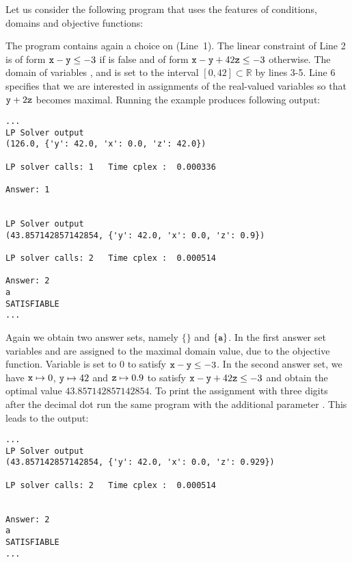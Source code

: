 \begin{example}\label{ex:lp:extended}
Let us consider the following program that uses the features of conditions, domains and objective functions:

The program contains again a choice on  (Line~1). 
%
The linear constraint of Line 2 is of form $\texttt{x}-\texttt{y}\leq-3$ if  is false 
and of form $\texttt{x}-\texttt{y}+42\texttt{z}\leq-3$ otherwise. 
%
The domain of variables ,  and  is set to the interval $[0,42]\subset\mathbb{R}$ by lines 3-5. 
%
Line 6 specifies that we are interested in assignments of the real-valued variables so that $\texttt{y}+2\texttt{z}$ becomes maximal. 
%
Running the example produces following output:
\begin{lstlisting}[numbers=none]
...
LP Solver output
(126.0, {'y': 42.0, 'x': 0.0, 'z': 42.0})

LP solver calls: 1   Time cplex :  0.000336

Answer: 1


LP Solver output
(43.857142857142854, {'y': 42.0, 'x': 0.0, 'z': 0.9})

LP solver calls: 2   Time cplex :  0.000514

Answer: 2
a
SATISFIABLE
...
\end{lstlisting}
Again we obtain two answer sets, namely $\{\}$ and $\{\texttt{a}\}$. 
%
In the first answer set variables  and  are assigned to the maximal domain value, due to the objective function. 
%
Variable  is set to 0 to satisfy $\texttt{x}-\texttt{y}\leq-3$. 
%
In the second answer set, we have $\texttt{x}\mapsto0$, $\texttt{y}\mapsto42$ and $\texttt{z}\mapsto0.9$ to satisfy $\texttt{x}-\texttt{y}+42\texttt{z}\leq-3$ and 
obtain the optimal value $43.857142857142854$. 
%
To print the assignment with three digits after the decimal dot run the same program with the additional parameter .
%
This leads to the output: 
\begin{lstlisting}[numbers=none]
...
LP Solver output
(43.857142857142854, {'y': 42.0, 'x': 0.0, 'z': 0.929})

LP solver calls: 2   Time cplex :  0.000514


Answer: 2
a
SATISFIABLE
...
\end{lstlisting}
\end{example}


